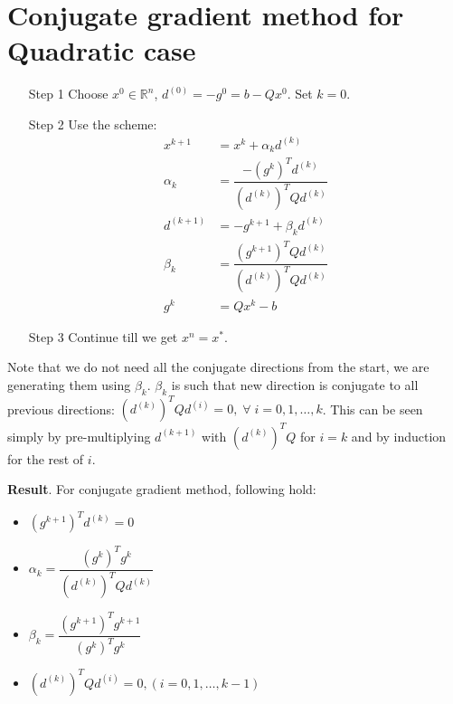 \documentclass[11pt]{article}
\begin{document}
\section*{Conjugate gradient method for Quadratic case}
\begin{enumerate}
    \item[Step 1] Choose $x^0\in\mathbb{R}^n$, $d^{(0)}=-g^0=b-Qx^0$. Set $k=0$.
    \item[Step 2] Use the scheme:
        \begin{align*}
            x^{k+1}&=x^k+\alpha_kd^{(k)}\\
            \alpha_k&=\dfrac{-(g^k)^Td^{(k)}}{(d^{(k)})^TQd^{(k)}}\\
            d^{(k+1)}&=-g^{k+1}+\beta_kd^{(k)}\\
            \beta_k&=\dfrac{(g^{k+1})^TQd^{(k)}}{(d^{(k)})^TQd^{(k)}}\\
            g^k&=Qx^k-b
        \end{align*}
    \item[Step 3] Continue till we get $x^n=x^*$.
\end{enumerate}
Note that we do not need all the conjugate directions from the start, we are generating
them using $\beta_k$. $\beta_k$ is such that new direction is conjugate to all 
previous directions: $(d^{(k)})^TQd^{(i)}=0,\;\forall\;i=0,1,\dotsc,k$. This can
be seen simply by pre-multiplying $d^{(k+1)}$ with $(d^{(k)})^TQ$ for $i=k$ and
by induction for the rest of $i$.

\vskip0.5cm\noindent\textbf{Result}. For conjugate gradient method, following hold:
\begin{itemize}
    \item $(g^{k+1})^Td^{(k)}=0$\\
    \item $\alpha_k=\dfrac{(g^k)^Tg^k}{(d^{(k)})^TQd^{(k)}}$\\
    \item $\beta_k=\dfrac{(g^{k+1})^Tg^{k+1}}{(g^k)^Tg^k}$\\
    \item $(d^{(k)})^TQd^{(i)}=0, (i=0,1,\dotsc,k-1)$\\
\end{itemize}
%
%
\end{document}
